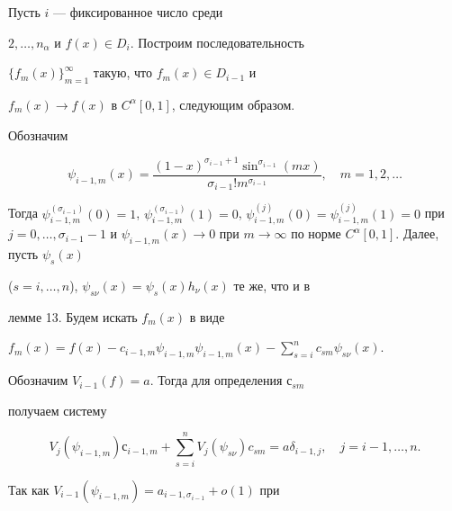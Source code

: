 \begin{pf}


Пусть $i$ --- фиксированное число среди


$2,\dotsc,n_\alpha$ и $f(x)\in D_i$. Построим последовательность


$\{f_m(x)\}_{m=1}^\infty$ такую, что $f_m(x)\in D_{i-1}$ и


$f_m(x)\to f(x)$ в $C^\alpha[0,1]$, следующим образом.





Обозначим


$$


\psi_{i-1,m}(x)= \frac{(1-x)^{\sigma_{i-1}+1}\sin^{\sigma_{i-


1}}(mx)}{ \sigma_{i-1}!m^{\sigma_{i-1}}},\quad


m=1,2,\dotsc 


$$


Тогда $\psi_{i-1,m}^{(\sigma_{i-1})}(0)=1$, $\psi_{i-


1,m}^{(\sigma_{i-1})}(1)=0$, $\psi_{i-1,m}^{(j)}(0)= \psi_{i-


1,m}^{(j)}(1)=0$ при $j=0,\dotsc,\sigma_{i-1}-1$ и $\psi_{i-1,m}(x)\to


0$ при $m\to\infty$ по норме $C^\alpha[0,1]$. Далее, пусть $\psi_s(x)$


($s=i,\dotsc,n$), $\psi_{s\nu}(x)=\psi_s(x)h_\nu(x)$ те же, что и в


лемме 13. Будем искать $f_m(x)$ в виде


$f_m(x)=f(x)-c_{i-1,m}\psi_{i-1,m}\psi_{i-1,m}(x)-


\sum\limits_{s=i}^nc_{sm}\psi_{s\nu}(x)$.





Обозначим $V_{i-1}(f)=a$. Тогда для определения $с_{sm}$


получаем систему


\begin{equation}


V_j(\psi_{i-1,m})с_{i-1,m}+\sum\limits_{s=i}^nV_j(\psi_{s\nu})


c_{sm}=a\delta_{i-1,j},


\quad j=i-1,\dotsc,n.


\end{equation}





Так как $V_{i-1}(\psi_{i-1,m})=a_{i-1,\sigma_{i-1}}+o(1)$ при



\end{pf}
